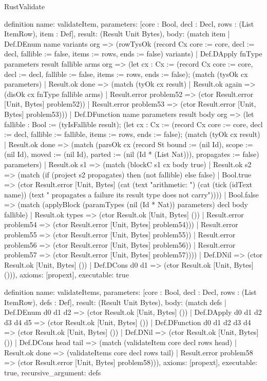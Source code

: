 \begin{lexlean}{RustValidate}
\begin{semanticmodule}
definition{
  name: validateItem,
  parameters: [core : Bool, decl : Decl, rows : (List ItemRow), item : Def],
  result: (Result Unit Bytes),
  body: (match item
    | Def.DEnum name variants org => (rowTysOk (record Cx {core := core, decl := decl, fallible := false, items := rows, ends := false}) variants)
    | Def.DApply fnType parameters result fallible arms org => (let cx : Cx := (record Cx {core := core, decl := decl, fallible := false, items := rows, ends := false}); (match (tysOk cx parameters)
      | Result.ok done => (match (tyOk cx result)
        | Result.ok again => (disOk cx fnType fallible arms)
        | Result.error problem52 => (ctor Result.error [Unit, Bytes] problem52))
      | Result.error problem53 => (ctor Result.error [Unit, Bytes] problem53)))
    | Def.DFunction name parameters result body org => (let fallible : Bool := (tyIsFallible result); (let cx : Cx := (record Cx {core := core, decl := decl, fallible := fallible, items := rows, ends := false}); (match (tyOk cx result)
      | Result.ok done => (match (parsOk cx (record St {bound := (nil Id), scope := (nil Id), moved := (nil Id), parted := (nil (Id * (List Nat))), propagates := false}) parameters)
        | Result.ok s1 => (match (blockC s1 cx body true)
          | Result.ok s2 => (match (if (project s2 propagates) then (not fallible) else false)
            | Bool.true => (ctor Result.error [Unit, Bytes] (cat (text "arithmetic: ") (cat (tick (idText name)) (text " propagates a failure its result type does not carry"))))
            | Bool.false => (match (applyBlock (paramTypes (nil (Id * Nat)) parameters) decl body fallible)
              | Result.ok types => (ctor Result.ok [Unit, Bytes] ())
              | Result.error problem54 => (ctor Result.error [Unit, Bytes] problem54)))
          | Result.error problem55 => (ctor Result.error [Unit, Bytes] problem55))
        | Result.error problem56 => (ctor Result.error [Unit, Bytes] problem56))
      | Result.error problem57 => (ctor Result.error [Unit, Bytes] problem57))))
    | Def.DNil => (ctor Result.ok [Unit, Bytes] ())
    | Def.DCons d0 d1 => (ctor Result.ok [Unit, Bytes] ())),
  axioms: [propext],
  executable: true
}

definition{
  name: validateItems,
  parameters: [core : Bool, decl : Decl, rows : (List ItemRow), defs : Def],
  result: (Result Unit Bytes),
  body: (match defs
    | Def.DEnum d0 d1 d2 => (ctor Result.ok [Unit, Bytes] ())
    | Def.DApply d0 d1 d2 d3 d4 d5 => (ctor Result.ok [Unit, Bytes] ())
    | Def.DFunction d0 d1 d2 d3 d4 => (ctor Result.ok [Unit, Bytes] ())
    | Def.DNil => (ctor Result.ok [Unit, Bytes] ())
    | Def.DCons head tail => (match (validateItem core decl rows head)
      | Result.ok done => (validateItems core decl rows tail)
      | Result.error problem58 => (ctor Result.error [Unit, Bytes] problem58))),
  axioms: [propext],
  executable: true,
  recursive_argument: defs
}


\end{semanticmodule}
\end{lexlean}
